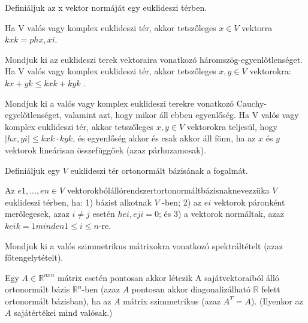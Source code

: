 \begin{frame}
  \begin{tcolorbox}[title={40}]
   Definiáljuk az x vektor normáját egy euklideszi térben.

  \tcblower
Ha V valós vagy komplex euklideszi tér, akkor tetszőleges $x \in V$ vektorra $kxk =phx,xi$.

  \end{tcolorbox}
\end{frame}


\begin{frame}
  \begin{tcolorbox}[title={41}]
     Mondjuk ki az euklideszi terek vektoraira vonatkozó háromszög-egyenlőtlenséget.
  \tcblower
Ha V valós vagy komplex euklideszi tér, akkor tetszőleges $x,y \in V$ vektorokra: $kx + yk \leq kxk + kyk$ .

  \end{tcolorbox}
\end{frame}


\begin{frame}
  \begin{tcolorbox}[title={42}]
    Mondjuk ki a valós vagy komplex euklideszi terekre vonatkozó Cauchy-egyelőtlenséget, valamint azt, hogy mikor áll ebben egyenlőség.
  \tcblower
Ha V valós vagy komplex euklideszi tér, akkor tetszőleges $x,y \in V$ vektorokra teljesül, hogy $|hx,yi| \leq kxk \cdot kyk$, és egyenlőség akkor és csak akkor áll fönn, ha az $x$ és $y$ vektorok lineárisan összefüggőek (azaz párhuzamosak).

  \end{tcolorbox}
\end{frame}


\begin{frame}
  \begin{tcolorbox}[title={43}]
    Definiáljuk egy $V$ euklideszi tér ortonormált bázisának a fogalmát.

  \tcblower
Az $e1,...,en \in V$ vektorokbólállórendszertortonormáltbázisnaknevezzüka $V$ euklideszi térben, ha: 1) bázist alkotnak $V$ -ben; 2) az $ei$ vektorok páronként merőlegesek, azaz $i \neq j$ esetén $hei,eji = 0$; és 3) a vektorok normáltak, azaz $keik = 1 minden 1 \leq i \leq n$-re. 
  \end{tcolorbox}
\end{frame}


\begin{frame}
  \begin{tcolorbox}[title={44}]
    Mondjuk ki a valós szimmetrikus mátrixokra vonatkozó spektráltételt (azaz főtengelytételt).

  \tcblower
Egy $A \in \mathbb{R}^{n x n}$ mátrix esetén pontosan akkor létezik A sajátvektoraiból álló ortonormált bázis $\mathbb{R}^n$-ben (azaz $A$ pontosan akkor diagonalizálható $\mathbb{R}$ felett ortonormált bázisban), ha az $A$ mátrix szimmetrikus (azaz $A^T = A$). (Ilyenkor az $A$ sajátértékei mind valósak.)

  \end{tcolorbox}
\end{frame}


